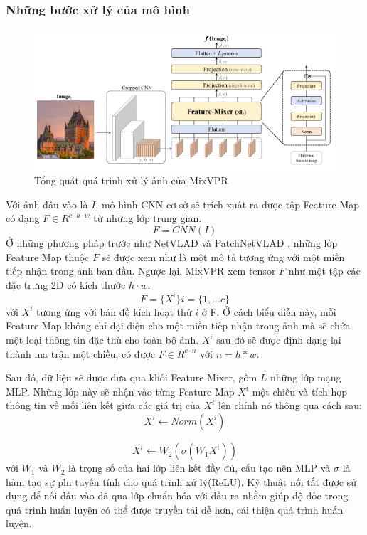 \subsubsection*{Những bước xử lý của mô hình}
\begin{figure}[H]
    \centering
    \includegraphics[scale=0.7]{pics/Proposal/mixvpr.png}
    \caption{Tổng quát quá trình xử lý ảnh của MixVPR}
\end{figure}
Với ảnh đầu vào là $I$, mô hình CNN cơ sở sẽ trích xuất ra được tập Feature Map có dạng $F \in R^{c \cdot h \cdot w}$ từ những lớp trung gian.
$$
F = CNN(I)
$$
Ở những phương pháp trước như NetVLAD \cite{arandjelović2016netvlad} và PatchNetVLAD \cite{hausler2021patchnetvlad}, những lớp Feature Map thuộc $F$ sẽ được xem như là một mô tả tương ứng với một miền tiếp nhận trong ảnh ban đầu. Ngược lại, MixVPR xem tensor $F$ như một tập các đặc trưng 2D có kích thước $h \cdot w$.
$$
F = \{X^{i}\}    i = \{1,...c\}
$$
với $X^{i}$ tương ứng với bản đồ kích hoạt thứ $i$ ở F. Ở cách biểu diễn này, mỗi Feature Map không chỉ đại diện cho một miền tiếp nhận trong ảnh mà sẽ chứa một loại thông tin đặc thù cho toàn bộ ảnh. $X^{i}$ sau đó sẽ được định dạng lại thành ma trận một chiều, có được $F \in R^{c \cdot n}$ với $n = h*w$.

Sau đó, dữ liệu sẽ được đưa qua khối Feature Mixer, gồm $L$ những lớp mạng MLP. Những lớp này sẽ nhận vào từng Feature Map $X^{i}$ một chiều và tích hợp thông tin về mối liên kết giữa các giá trị của $X^{i}$ lên chính nó thông qua cách sau:
$$
X^{i} \leftarrow Norm(X^{i})
$$

$$
X^{i} \leftarrow W_2(\sigma(W_1 X^{i}))
$$
với $W_1$ và $W_2$ là trọng số của hai lớp liên kết đầy đủ, cấu tạo nên MLP và $\sigma$ là hàm tạo sự phi tuyến tính cho quá trình xử lý(ReLU). Kỹ thuật nối tắt được sử dụng để nối đầu vào đã qua lớp chuẩn hóa với đầu ra nhằm giúp độ dốc trong quá trình huấn luyện có thể được truyền tải dễ hơn, cải thiện quá trình huấn luyện.

